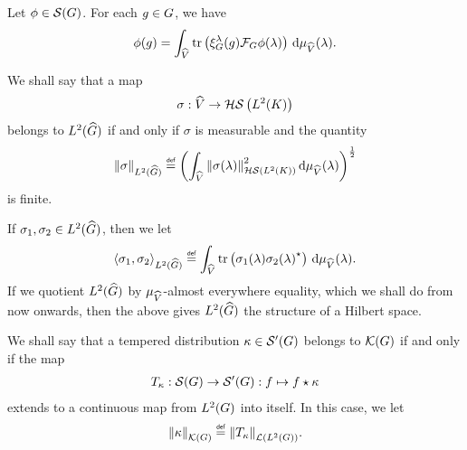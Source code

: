 \begin{proposition}
\label{proposition:inverse_Fourier_Transform}
    Let $\phi \in {\mathcal{S} (G)}$.
    For each $g \in G$,
    we have
    \begin{align*}
        \phi(g)
        = \int_{\widehat{V}}
        \operatorname{tr} \left( \xi^{\lambda}_G(g) \mathcal{F}_{G} \phi(\lambda) \right) \,\mathrm{d} \mu_{{\widehat{V}}}(\lambda).
    \end{align*}
\end{proposition}

\begin{definition}
    We shall say that a map
    \begin{align*}
        \sigma : {\widehat{V}} \to {\mathcal{HS} \left({L^{2} (K)}\right)}
    \end{align*}
    belongs to ${L^{2} ({\widehat{G}})}$ if and only if $\sigma$ is measurable and the quantity
    \begin{align*}
        \norm[\LebesgueDual{2}{\Group}]{\sigma} \defeq
            \left(
                \int_\dualGroup{\VectorSpace}
                    \norm[\HilbertSchmidt{\Lebesgue{2}{\CompactGroup}}]{\sigma(\lambda)}^2
                \dd \Plancherel{\VectorSpace}(\lambda)
            \right)^{\frac{1}{2}}
    \end{align*}
    is finite.

    If $\sigma_1, \sigma_2 \in {L^{2} ({\widehat{G}})}$, then we let
    \begin{align*}
        \ip[\LebesgueDual{2}{\Group}]{\sigma_1}{\sigma_2} \defeq
        \int_\dualGroup{\VectorSpace}
            \tr\left(
                \sigma_1(\lambda) \adj{\sigma_2(\lambda)}
            \right)
        \dd \Plancherel{\VectorSpace}(\lambda).
    \end{align*}
    If we quotient ${L^{2} ({\widehat{G}})}$ by $\mu_{{\widehat{V}}}$-almost everywhere equality,
    which we shall do from now onwards,
    then the above gives ${L^{2} ({\widehat{G}})}$ the structure of a Hilbert space.
\end{definition}

\begin{definition}[$\Kernels{\Group}$]
    We shall say that a tempered distribution $\kappa \in {\mathcal{S}' (G)}$ belongs to $\Kernels{\Group}$
    if and only if the map
    \begin{align}
        T_\kappa : {\mathcal{S} (G)} \to {\mathcal{S}' (G)} : f \mapsto f \star \kappa
    \end{align}
    extends to a continuous map from ${L^{2} (G)}$ into itself.
    In this case, we let
    \begin{align*}
        \norm[\Kernels{\Group}]{\kappa} \defeq \norm[\Lin{\Lebesgue{2}{\Group}}]{T_\kappa}.
    \end{align*}
\end{definition}

